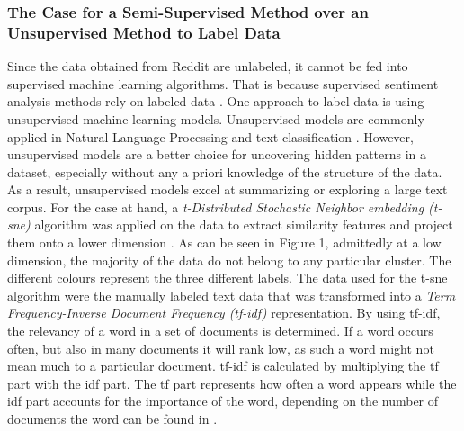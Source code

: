 \documentclass[11pt, a4paper]{article}
\begin{document}
\subsubsection{The Case for a Semi-Supervised Method over an Unsupervised Method to Label Data}
Since the data obtained from Reddit are unlabeled, it cannot be fed into supervised machine learning algorithms. 
That is because supervised sentiment analysis methods rely on labeled data \citep{sazzed2021ssentia}. One approach to label 
data is using unsupervised machine learning models. Unsupervised models are commonly applied in Natural Language Processing 
and text classification \citep{jung2019automatedclassification}. However, unsupervised models are a better choice for uncovering hidden 
patterns in a dataset, especially without any a priori knowledge of the structure of the data. As a result, unsupervised models 
excel at summarizing or exploring a large text corpus. 
For the case at hand, a \emph{t-Distributed Stochastic Neighbor embedding (t-sne)} algorithm was applied on the data to extract similarity 
features and project them onto a lower dimension \citep{binu2020dimreductiontsne}. As can be seen in Figure 1, admittedly 
at a low dimension, the majority of the data do not belong to any particular cluster. The different colours represent the three different 
labels. The data used for the t-sne algorithm were the
manually labeled text data that was transformed into a \emph{Term Frequency-Inverse Document Frequency (tf-idf)} representation.
By using tf-idf, the relevancy of a word in a set of documents is determined. If a word occurs often, but also in many documents
it will rank low, as such a word might not mean much to a particular document. tf-idf is calculated by multiplying the tf part with the
idf part. The tf part represents how often a word appears while the idf part accounts for the importance of the word, depending on
the number of documents the word can be found in \citep{Guia2019ComparisonON, jason2021tfidf}.
\end{document}
